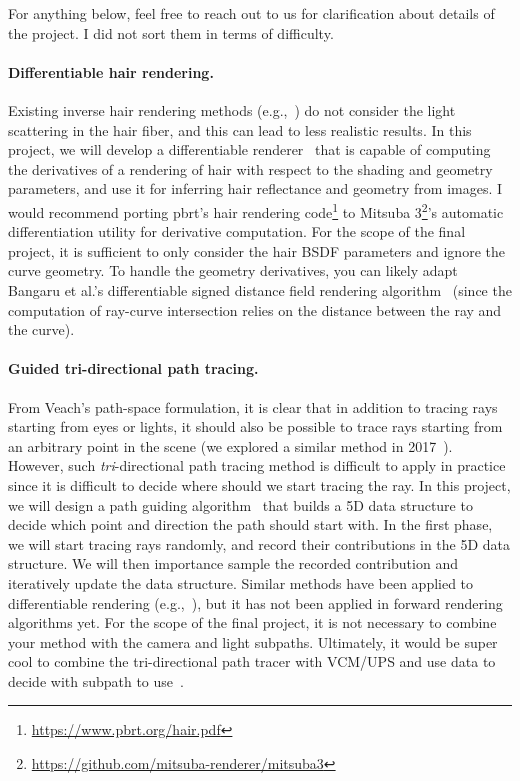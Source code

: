 For anything below, feel free to reach out to us for clarification about details of the project.
I did not sort them in terms of difficulty.

\paragraph{Differentiable hair rendering.}
Existing inverse hair rendering methods (e.g.,~\cite{Rosu:2022:NSL}) do not consider the light scattering in the hair fiber, and this can lead to less realistic results.
In this project, we will develop a differentiable renderer~\cite{Li:2018:DMC} that is capable of computing the derivatives of a rendering of hair with respect to the shading and geometry parameters, and use it for inferring hair reflectance and geometry from images.
I would recommend porting pbrt's hair rendering code\footnote{\url{https://www.pbrt.org/hair.pdf}} to Mitsuba 3\footnote{\url{https://github.com/mitsuba-renderer/mitsuba3}}'s automatic differentiation utility for derivative computation.
For the scope of the final project, it is sufficient to only consider the hair BSDF parameters and ignore the curve geometry.
To handle the geometry derivatives, you can likely adapt Bangaru et al.'s differentiable signed distance field rendering algorithm~\cite{Bangaru:2022:DRN} (since the computation of ray-curve intersection relies on the distance between the ray and the curve).

\paragraph{Guided tri-directional path tracing.}
From Veach's path-space formulation, it is clear that in addition to tracing rays starting from eyes or lights, it should also be possible to trace rays starting from an arbitrary point in the scene (we explored a similar method in 2017~\cite{Anderson:2017:AED}). 
However, such \emph{tri}-directional path tracing method is difficult to apply in practice since it is difficult to decide where should we start tracing the ray. 
In this project, we will design a path guiding algorithm~\cite{Lafortune:1995:5RV,Muller:2017:PPG} that builds a 5D data structure to decide which point and direction the path should start with.
In the first phase, we will start tracing rays randomly, and record their contributions in the 5D data structure.
We will then importance sample the recorded contribution and iteratively update the data structure.
Similar methods have been applied to differentiable rendering (e.g.,~\cite{Yan:2022:EEB}), but it has not been applied in forward rendering algorithms yet.
For the scope of the final project, it is not necessary to combine your method with the camera and light subpaths.
Ultimately, it would be super cool to combine the tri-directional path tracer with VCM/UPS and use data to decide with subpath to use~\cite{Grittmann:2022:EMI}.

